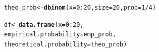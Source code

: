 \documentclass[11pt, a4paper]{article}\usepackage[]{graphicx}\usepackage[]{xcolor}
\makeatletter
\newcommand{\hlnum}[1]{\textcolor[rgb]{0.686,0.059,0.569}{#1}}%
\newcommand{\hlopt}[1]{\textcolor[rgb]{0,0,0}{#1}}%
\newcommand{\hldef}[1]{\textcolor[rgb]{0.345,0.345,0.345}{#1}}%
\newcommand{\hlkwb}[1]{\textcolor[rgb]{0.69,0.353,0.396}{#1}}%
\newcommand{\hlkwc}[1]{\textcolor[rgb]{0.333,0.667,0.333}{#1}}%
\newcommand{\hlkwd}[1]{\textcolor[rgb]{0.737,0.353,0.396}{\textbf{#1}}}%
\newenvironment{kframe}{%
 \def\at@end@of@kframe{}%
 \ifinner\ifhmode%
  \def\at@end@of@kframe{\end{minipage}}%
  \begin{minipage}{\columnwidth}%
 \fi\fi%
 \def\FrameCommand##1{\hskip\@totalleftmargin \hskip-\fboxsep
 \colorbox{shadecolor}{##1}\hskip-\fboxsep
     \hskip-\linewidth \hskip-\@totalleftmargin \hskip\columnwidth}%
 \MakeFramed {\advance\hsize-\width
   \@totalleftmargin\z@ \linewidth\hsize
   \@setminipage}}%
 {\par\unskip\endMakeFramed%
 \at@end@of@kframe}
\newenvironment{knitrout}{}{} %
\makeatother
\begin{document}
\begin{knitrout}
\color{fgcolor}\begin{kframe}
\begin{alltt}
\hldef{theo_prob} \hlkwb{<-} \hlkwd{dbinom}\hldef{(}\hlkwc{x} \hldef{=} \hlnum{0}\hlopt{:}\hlnum{20}\hldef{,} \hlkwc{size} \hldef{=} \hlnum{20}\hldef{,} \hlkwc{prob} \hldef{=} \hlnum{1}\hlopt{/}\hlnum{4}\hldef{)}
\end{alltt}
\end{kframe}
\end{knitrout}

\begin{knitrout}
\color{fgcolor}\begin{kframe}
\begin{alltt}
\hldef{df} \hlkwb{<-} \hlkwd{data.frame}\hldef{(}\hlkwc{x} \hldef{=} \hlnum{0}\hlopt{:}\hlnum{20}\hldef{,}
                 \hlkwc{empirical.probability} \hldef{= emp_prob,}
                 \hlkwc{theoretical.probability} \hldef{= theo_prob)}
\end{alltt}
\end{kframe}
\end{knitrout}
\end{document}
